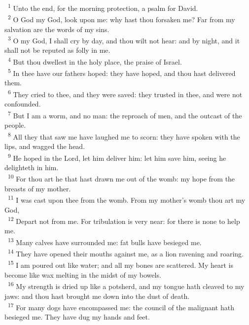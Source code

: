 \documentclass[a5paper,12pt]{article}
\begin{document}
\begin{multicols*}{2}
~\textsuperscript{1} Unto the end, for the morning protection, a psalm for David.\\
~\textsuperscript{2} O God my God, look upon me: why hast thou forsaken me? Far from my salvation are the words of my sins.\\
~\textsuperscript{3} O my God, I shall cry by day, and thou wilt not hear: and by night, and it shall not be reputed as folly in me.\\
~\textsuperscript{4} But thou dwellest in the holy place, the praise of Israel.\\
~\textsuperscript{5} In thee have our fathers hoped: they have hoped, and thou hast delivered them.\\


~\textsuperscript{6} They cried to thee, and they were saved: they trusted in thee, and were not confounded.\\
~\textsuperscript{7} But I am a worm, and no man: the reproach of men, and the outcast of the people.\\
~\textsuperscript{8} All they that saw me have laughed me to scorn: they have spoken with the lips, and wagged the head.\\
~\textsuperscript{9} He hoped in the Lord, let him deliver him: let him save him, seeing he delighteth in him.\\
~\textsuperscript{10} For thou art he that hast drawn me out of the womb: my hope from the breasts of my mother.\\
~\textsuperscript{11} I was cast upon thee from the womb. From my mother's womb thou art my God,\\
~\textsuperscript{12} Depart not from me. For tribulation is very near: for there is none to help me.\\
~\textsuperscript{13} Many calves have surrounded me: fat bulls have besieged me.\\
~\textsuperscript{14} They have opened their mouths against me, as a lion ravening and roaring.\\
~\textsuperscript{15} I am poured out like water; and all my bones are scattered. My heart is become like wax melting in the midst of my bowels.\\
~\textsuperscript{16} My strength is dried up like a potsherd, and my tongue hath cleaved to my jaws: and thou hast brought me down into the dust of death.\\
~\textsuperscript{17} For many dogs have encompassed me: the council of the malignant hath besieged me. They have dug my hands and feet.\\

\end{multicols*}
\end{document}
